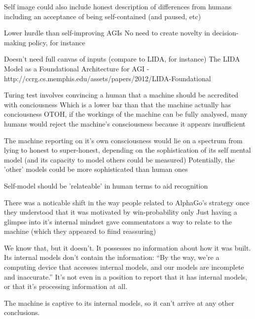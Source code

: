 \documentclass[citeauthoryear]{llncs}
\begin{document}
Self image could also include honest description of differences from humans
  including an acceptance of being self-contained (and paused, etc)




Lower hurdle than self-improving AGIs
  No need to create novelty in decision-making policy, for instance
  
Doesn't need full canvas of inputs (compare to LIDA, for instance)
  The LIDA Model as a Foundational Architecture for AGI - http://ccrg.cs.memphis.edu/assets/papers/2012/LIDA-Foundational%



Turing test involves convincing a human that a machine should be accredited with conciousness
  Which is a lower bar than that the machine actually has conciousness
  OTOH, if the workings of the machine can be fully analysed, many humans would reject the machine's consciousness because it appears insufficient

The machine reporting on it's own consciousness would lie on a spectrum from lying to honest to super-honest, 
  depending on the sophistication of its self mental model (and its capacity to model others could be measured)
  Potentially, the 'other' models could be more sophisticated than human ones
  
Self-model should be 'relateable' in human terms to aid recognition 
  
  There was a noticable shift in the way people related to AlphaGo's strategy once they understood that it was motivated by win-probability only
    Just having a glimpse into it's internal mindset gave commentators a way to relate to the machine (which they appeared to fiind reassuring)
    





We know that, but it doesn't. It possesses no information about how it was built. 
Its internal models don't contain the information: ``By the way, we're a computing device that 
accesses internal models, and our models are incomplete and inaccurate.''
It's not even in a position to report that it has internal models, or that it's processing information at all.
 
The machine is captive to its internal models, so it can't arrive at any other conclusions.
\end{document}
